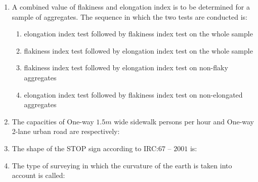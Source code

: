 \documentclass[journal]{IEEEtran}
\begin{document}
\begin{enumerate}
\item A combined value of flakiness and elongation index is to be determined for a sample of aggregates. The sequence in which the two tests are conducted is: \hfill {}

\begin{enumerate}
\item elongation index test followed by flakiness index test on the whole sample
\item flakiness index test followed by elongation index test on the whole sample
\item flakiness index test followed by elongation index test on non-flaky aggregates
\item elongation index test followed by flakiness index test on non-elongated aggregates
\end{enumerate}

\item The capacities of One-way $1.5 m$ wide sidewalk persons per hour and One-way 2-lane urban road 
{\fontsize{9}{7}\selectfont {}}
 are respectively: 
\hfill {}

\begin{enumerate}
\end{enumerate}

\item The shape of the STOP sign according to IRC:$67$ -- $2001$ is: \hfill {}
\begin{enumerate}
\end{enumerate}

\item The type of surveying in which the curvature of the earth is taken into account is called: \hfill {}
\begin{enumerate}
\end{enumerate}


\end{enumerate}
\end{document}
